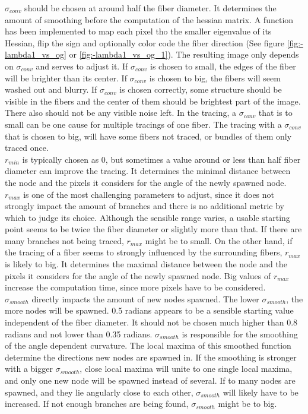 \documentclass[12pt,english,twocolumn]{revtex4}
\begin{document}
$\sigma_{conv}$ should be chosen at around half the fiber diameter. It determines the amount of smoothing before the computation of the hessian matrix. A function has been implemented to map each pixel tho the smaller eigenvalue of its Hessian, flip the sign and optionally color code the fiber direction (See figure \ref{fig:-lambda1_vs_og} or \ref{fig:-lambda1_vs_og_1}). The resulting image only depends on $\sigma_{conv}$ and serves to adjust it. If $\sigma_{conv}$ is chosen to small, the edges of the fiber will be brighter than its center. If $\sigma_{conv}$ is chosen to big, the fibers will seem washed out and blurry. If $\sigma_{conv}$ is chosen correctly, some structure should be visible in the fibers and the center of them should be brightest part of the image. There also should not be any visible noise left. In the tracing, a $\sigma_{conv}$ that is to small can be one cause for multiple tracings of one fiber. The tracing with a $\sigma_{conv}$ that is chosen to big, will have some fibers not traced, or bundles of them only traced once.\\


$r_{min}$ is typically chosen as 0, but sometimes a value around or less than half fiber diameter can improve the tracing. It determines the minimal distance between the node and the pixels it considers for the angle of the newly spawned node.\\


$r_{max}$ is one of the most challenging parameters to adjust, since it does not strongly impact the amount of branches and there is no additional metric by which to judge its choice. Although the sensible range varies, a usable starting point seems to be twice the fiber diameter or slightly more than that. If there are many branches not being traced, $r_{max}$ might be to small. On the other hand, if the tracing of a fiber seems to strongly influenced by the surrounding fibers, $r_{max}$ is likely to big. It determines the maximal distance between the node and the pixels it considers for the angle of the newly spawned node. Big values of $r_{max}$ increase the computation time, since more pixels have to be considered.\\


$\sigma_{smooth}$ directly impacts the amount of new nodes spawned. The lower $\sigma_{smooth}$, the more nodes will be spawned. 0.5 radians appears to be a sensible starting value independent of the fiber diameter. It should not be chosen much higher than 0.8 radians and not lower than 0.35 radians. $\sigma_{smooth}$ is responsible for the smoothing of the angle dependent curvature. The local maxima of this smoothed function determine the directions new nodes are spawned in. If the smoothing is stronger with a bigger $\sigma_{smooth}$, close local maxima will unite to one single local maxima, and only one new node will be spawned instead of several. If to many nodes are spawned, and they lie angularly close to each other, $\sigma_{smooth}$ will likely have to be increased. If not enough branches are being found, $\sigma_{smooth}$ might be to big.\\
\end{document}
